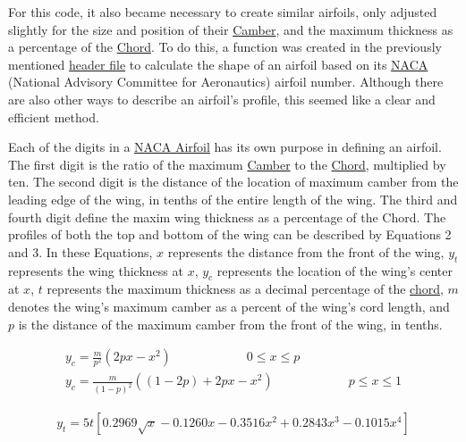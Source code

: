 \documentclass{article}
\begin{document}
For this code, it also became necessary to create similar airfoils, only adjusted slightly for the size and position of their \hyperlink{Camber}{Camber}, and the maximum thickness as a percentage of the \hyperlink{c}{Chord}. To do this, a function was created in the previously mentioned \href{https://github.com/JoeSpencer1/497R-Projects/blob/Airfoil-Analysis/Airfoil_Functions.jl}{header file} to calculate the shape of an airfoil based on its \hyperlink{NACA}{NACA} (National Advisory Committee for Aeronautics) airfoil number. Although there are also other ways to describe an airfoil's profile, this seemed like a clear and efficient method.\newline

Each of the digits in a \hyperlink{NACA}{NACA Airfoil} has its own purpose in defining an airfoil. The first digit is the ratio of the maximum \hyperlink{Camber}{Camber} to the \hyperlink{c}{Chord}, multiplied by ten. The second digit is the distance of the location of maximum camber from the leading edge of the wing, in tenths of the entire length of the wing. The third and fourth digit define the maxim wing thickness as a percentage of the Chord. The profiles of both the top and bottom of the wing can be described by Equations 2 and 3. In these Equations, $x$ represents the distance from the front of the wing, $y_{t}$ represents the wing thickness at $x$, $y_{c}$ represents the location of the wing's center at $x$, $t$ represents the maximum thickness as a decimal percentage of the \hyperlink{c}{chord}, $m$ denotes the wing's maximum camber as a percent of the wing's cord length, and $p$ is the distance of the maximum camber from the front of the wing, in tenths.

\begin{equation} \label{eq:2}
\begin{aligned}
	y_{c} = \frac{m}{p^2} (2 p x - x^2) \qquad \qquad \qquad 0 \leq x \leq p \\
	y_{c} = \frac{m}{(1 - p)^2} ((1 - 2 p) + 2 p x - x^2) \qquad \qquad \qquad p \leq x \leq 1
\end{aligned}
\end{equation}

\begin{equation} \label{eq:3}
\begin{aligned}
	y_{t} = 5 t [ 0.2969 \sqrt{x} - 0.1260 x - 0.3516 x^{2} + 0.2843 x^{3} - 0.1015 x^{4}]
\end{aligned}
\end{equation}
\end{document}
